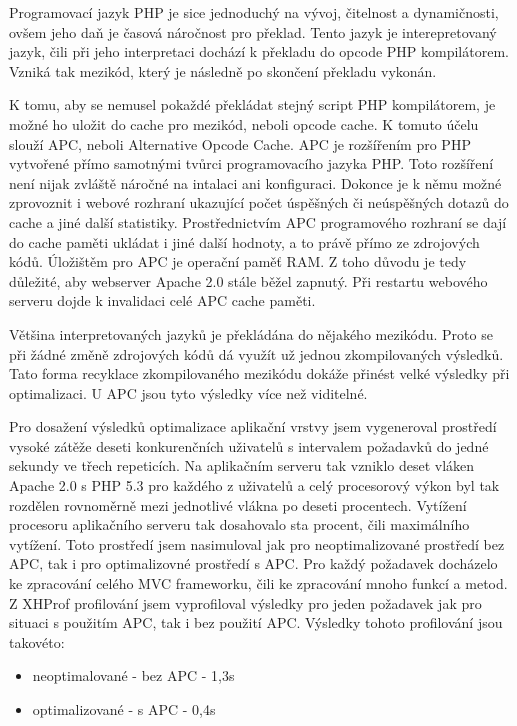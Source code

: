 \documentclass[12pt]{article}
\begin{document}
Programovací jazyk PHP je sice jednoduchý na vývoj, čitelnost a dynamičnosti, ovšem jeho daň je časová náročnost pro překlad. Tento jazyk je interepretovaný jazyk, čili při jeho interpretaci dochází k překladu do opcode PHP kompilátorem. Vzniká tak mezikód, který je následně po skončení překladu vykonán.

K tomu, aby se nemusel pokaždé překládat stejný script PHP kompilátorem, je možné ho uložit do cache pro mezikód, neboli opcode cache. K tomuto účelu slouží APC, neboli Alternative Opcode Cache. APC je rozšířením pro PHP vytvořené přímo samotnými tvůrci programovacího jazyka PHP. Toto rozšíření není nijak zvláště náročné na intalaci ani konfiguraci. Dokonce je k němu možné zprovoznit i webové rozhraní ukazující počet úspěšných či neúspěšných dotazů do cache a jiné další statistiky. Prostřednictvím APC programového rozhraní se dají do cache paměti ukládat i jiné další hodnoty, a to právě přímo ze zdrojových kódů. Úložištěm pro APC je operační paměť RAM. Z toho důvodu je tedy důležité, aby webserver Apache 2.0 stále běžel zapnutý. Při restartu webového serveru dojde k invalidaci celé APC cache paměti.\cite{apc}

Většina interpretovaných jazyků je překládána do nějakého mezikódu. Proto se při žádné změně zdrojových kódů dá využít už jednou zkompilovaných výsledků. Tato forma recyklace zkompilovaného mezikódu dokáže přinést velké výsledky při optimalizaci. U APC jsou tyto výsledky více než viditelné.

Pro dosažení výsledků optimalizace aplikační vrstvy jsem vygeneroval prostředí vysoké zátěže deseti konkurenčních uživatelů s intervalem požadavků do jedné sekundy ve třech repeticích. Na aplikačním serveru tak vzniklo deset vláken Apache 2.0 s PHP 5.3 pro každého z uživatelů a celý procesorový výkon byl tak rozdělen rovnoměrně mezi jednotlivé vlákna po deseti procentech. Vytížení procesoru aplikačního serveru tak dosahovalo sta procent, čili maximálního vytížení. Toto prostředí jsem nasimuloval jak pro neoptimalizované prostředí bez APC, tak i pro optimalizovné prostředí s APC. Pro každý požadavek docházelo ke zpracování celého MVC frameworku, čili ke zpracování mnoho funkcí a metod. Z XHProf profilování jsem vyprofiloval výsledky pro jeden požadavek jak pro situaci s použitím APC, tak i bez použití APC. Výsledky tohoto profilování jsou takovéto:

\begin{itemize}
\item neoptimalované - bez APC - 1,3s
\item optimalizované - s APC - 0,4s
\end{itemize}
\end{document}
